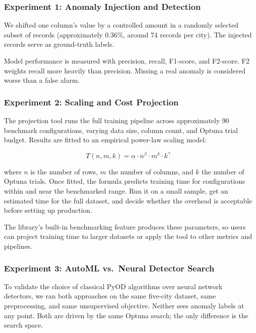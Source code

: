 \documentclass[12pt]{article}
\begin{document}
\subsubsection{Experiment 1: Anomaly Injection and Detection}

We shifted one column's value by a controlled amount in a randomly selected subset of records (approximately 0.36\%, around 74 records per city). The injected records serve as ground-truth labels.

Model performance is measured with precision, recall, F1-score, and F2-score. F2 weights recall more heavily than precision. Missing a real anomaly is considered worse than a false alarm.

\subsubsection{Experiment 2: Scaling and Cost Projection}

The projection tool runs the full training pipeline across approximately 90 benchmark configurations, varying data size, column count, and Optuna trial budget. Results are fitted to an empirical power-law scaling model:

$$T(n, m, k) = \alpha \cdot n^{\beta} \cdot m^{\delta} \cdot k^{\gamma}$$

where $n$ is the number of rows, $m$ the number of columns, and $k$ the number of Optuna trials. Once fitted, the formula predicts training time for configurations within and near the benchmarked range. Run it on a small sample, get an estimated time for the full dataset, and decide whether the overhead is acceptable before setting up production.

The library's built-in benchmarking feature produces these parameters, so users can project training time to larger datasets or apply the tool to other metrics and pipelines.

\subsubsection{Experiment 3: AutoML vs.\ Neural Detector Search}
\label{sec:autonn_setup}

To validate the choice of classical PyOD algorithms over neural network detectors, we ran both approaches on the same five-city dataset, same preprocessing, and same unsupervised objective. Neither sees anomaly labels at any point. Both are driven by the same Optuna search; the only difference is the search space.
\end{document}
